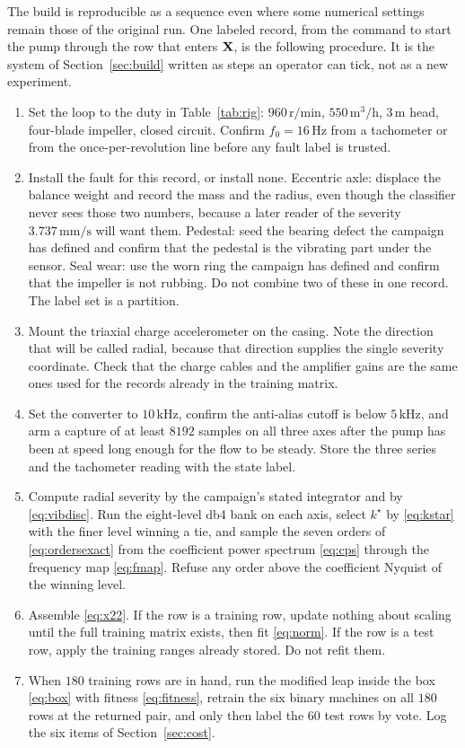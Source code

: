 The build is reproducible as a sequence even where some numerical settings remain those of the original run.
One labeled record, from the command to start the pump through the row that enters \(\mathbf{X}\), is the following procedure.
It is the system of Section~\ref{sec:build} written as steps an operator can tick, not as a new experiment.
\begin{enumerate}
\item Set the loop to the duty in Table~\ref{tab:rig}: \(960\,\mathrm{r/min}\), \(550\,\mathrm{m}^{3}/\mathrm{h}\), \(3\,\mathrm{m}\) head, four-blade impeller, closed circuit.
Confirm \(f_{0}=16\,\mathrm{Hz}\) from a tachometer or from the once-per-revolution line before any fault label is trusted.
\item Install the fault for this record, or install none.
Eccentric axle: displace the balance weight and record the mass and the radius, even though the classifier never sees those two numbers, because a later reader of the severity \(3.737\,\mathrm{mm/s}\) will want them.
Pedestal: seed the bearing defect the campaign has defined and confirm that the pedestal is the vibrating part under the sensor.
Seal wear: use the worn ring the campaign has defined and confirm that the impeller is not rubbing.
Do not combine two of these in one record.
The label set is a partition.
\item Mount the triaxial charge accelerometer on the casing.
Note the direction that will be called radial, because that direction supplies the single severity coordinate.
Check that the charge cables and the amplifier gains are the same ones used for the records already in the training matrix.
\item Set the converter to \(10\,\mathrm{kHz}\), confirm the anti-alias cutoff is below \(5\,\mathrm{kHz}\), and arm a capture of at least \(8192\) samples on all three axes after the pump has been at speed long enough for the flow to be steady.
Store the three series and the tachometer reading with the state label.
\item Compute radial severity by the campaign's stated integrator and by \eqref{eq:vibdisc}.
Run the eight-level db4 bank on each axis, select \(k^{\star}\) by \eqref{eq:kstar} with the finer level winning a tie, and sample the seven orders of \eqref{eq:ordersexact} from the coefficient power spectrum \eqref{eq:cps} through the frequency map \eqref{eq:fmap}.
Refuse any order above the coefficient Nyquist of the winning level.
\item Assemble \eqref{eq:x22}.
If the row is a training row, update nothing about scaling until the full training matrix exists, then fit \eqref{eq:norm}.
If the row is a test row, apply the training ranges already stored.
Do not refit them.
\item When \(180\) training rows are in hand, run the modified leap inside the box \eqref{eq:box} with fitness \eqref{eq:fitness}, retrain the six binary machines on all \(180\) rows at the returned pair, and only then label the \(60\) test rows by vote.
Log the six items of Section~\ref{sec:cost}.
\end{enumerate}
